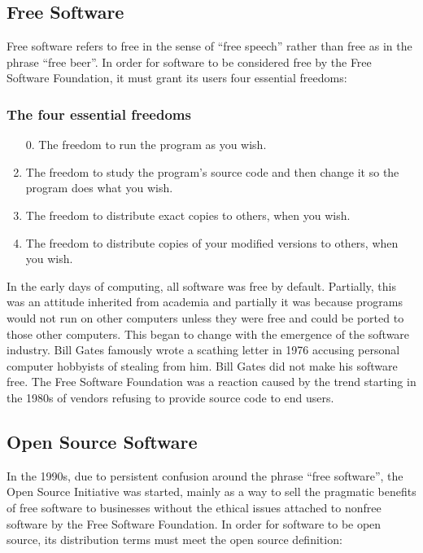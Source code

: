 \documentclass[12pt,letterpaper]{article}
\begin{document}
\subsection{Free Software}

Free software refers to free in the sense of ``free speech'' rather than free as in the phrase ``free beer''. In order for software to be considered free by the Free Software Foundation, it must grant its users four essential freedoms:\cite{fourfreedoms}

\subsubsection*{The four essential freedoms}
\begin{enumerate}
\item[0.] The freedom to run the program as you wish.
\item The freedom to study the program's source code and then change it so the program does what you wish.
\item The freedom to distribute exact copies to others, when you wish.
\item The freedom to distribute copies of your modified versions to others, when you wish.
\end{enumerate}

 In the early days of computing, all software was free by default. Partially, this was an attitude inherited from academia and partially it was because programs would not run on other computers unless they were free and could be ported to those other computers. This began to change with the emergence of the software industry.\cite{fsfhistory} Bill Gates famously wrote a scathing letter in  1976 accusing personal computer hobbyists of stealing from him. Bill Gates did not make his software free.\cite{billyg} The Free Software Foundation was a reaction caused by the trend starting in the 1980s of vendors refusing to provide source code to end users.\cite{fsfhistory}

\subsection{Open Source Software}

In the 1990s, due to persistent confusion around the phrase ``free software'', the Open Source Initiative was started, mainly as a way to sell the pragmatic benefits of free software to businesses without the ethical issues attached to nonfree software by the Free Software Foundation.\cite{opensourcehistory} In order for software to be open source, its distribution terms must meet the open source definition:
\end{document}
